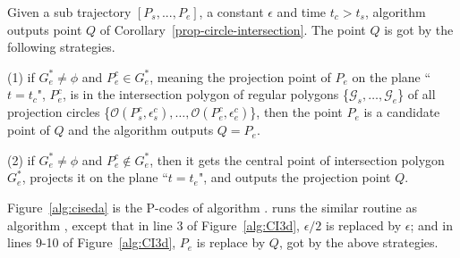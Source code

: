 %

Given a sub trajectory $[P_s,...,P_e]$, a constant $\epsilon$ and time $t_c > t_s$, algorithm \cista outputs point $Q$ of Corollary~\ref{prop-circle-intersection}. The point $Q$ is got by the following strategies.

(1) if $G^*_e \ne \phi$ and $P^c_e \in G^*_e$, meaning the projection point of $P_e$ on the plane ``$t=t_c$", \ie $P^c_e$, is in the intersection polygon of regular polygons \{$\mathcal{G}_s, \dots, \mathcal{G}_e$\} of all projection circles \{$\mathcal{O}(P^c_s, \epsilon^c_s), \ldots, \mathcal{O}(P^c_e, \epsilon^c_e)$\}, then the point $P_e$ is a candidate point of $Q$ and the algorithm outputs $Q=P_e$.

(2) if $G^*_e \ne \phi$ and $P^c_e \notin G^*_e$, then it gets the central point of intersection polygon $G^*_e$, projects it on the plane ``$t=t_e$", and outputs the projection point $Q$.

Figure~\ref{alg:ciseda} is the P-codes of algorithm \cista. \cista runs the similar routine as algorithm \cist, except that in line 3 of Figure~\ref{alg:CI3d}, $\epsilon/2$ is replaced by $\epsilon$; and in lines 9-10 of Figure~\ref{alg:CI3d}, $P_e$ is replace by $Q$, got by the above strategies.


